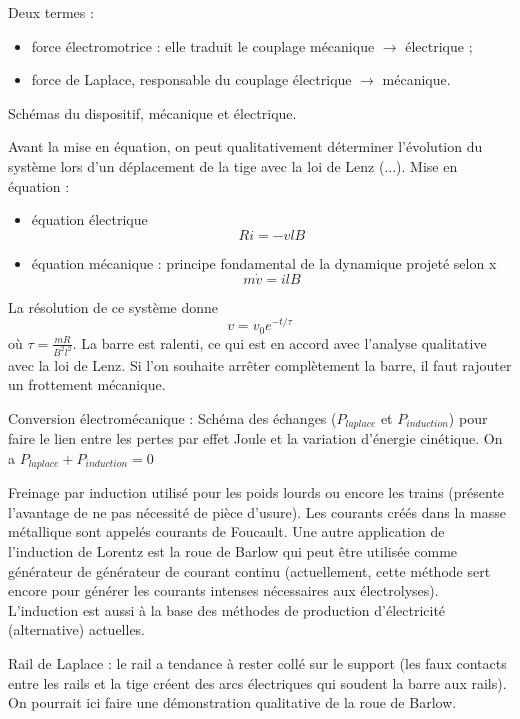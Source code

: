 Deux termes : 
\begin{itemize}
\item force électromotrice : elle traduit le couplage mécanique $\rightarrow$ électrique ;
\item force de Laplace, responsable du couplage électrique $\rightarrow$ mécanique.
\end{itemize}
Schémas du dispositif, mécanique et électrique.

Avant la mise en équation, on peut qualitativement déterminer l'évolution du système lors d'un déplacement de la tige avec la loi de Lenz (...).
Mise en équation :
\begin{itemize}
\item équation électrique
\begin{equation}
Ri = -vlB
\end{equation}
\item équation mécanique : principe fondamental de la dynamique projeté selon x
\begin{equation}
m\dot{v} = ilB
\end{equation}
\end{itemize}
La résolution de ce système donne 
\begin{equation}
v = v_0 e^{-t/\tau}
\end{equation}
où $\tau = \frac{mR}{B^2 l^2}$.
La barre est ralenti, ce qui est en accord avec l'analyse qualitative avec la loi de Lenz.
Si l'on souhaite arrêter complètement la barre, il faut rajouter un frottement mécanique.

Conversion électromécanique :
Schéma des échanges ($P_{laplace}$ et $P_{induction}$) pour faire le lien entre les pertes par effet Joule et la variation d'énergie cinétique.
On a $P_{laplace} + P_{induction} = 0$

\begin{slide}
Freinage par induction utilisé pour les poids lourds ou encore les trains (présente l'avantage de ne pas nécessité de pièce d'usure).
Les courants créés dans la masse métallique sont appelés courants de Foucault.
Une autre application de l'induction de Lorentz est la roue de Barlow qui peut être utilisée comme générateur de générateur de courant continu (actuellement, cette méthode sert encore pour générer les courants intenses nécessaires aux électrolyses).
L'induction est aussi à la base des méthodes de production d'électricité (alternative) actuelles.
\end{slide}

\begin{experience}
Rail de Laplace : le rail a tendance à rester collé sur le support (les faux contacts entre les rails et la tige créent des arcs électriques qui soudent la barre aux rails).
On pourrait ici faire une démonstration qualitative de la roue de Barlow.
\end{experience}

